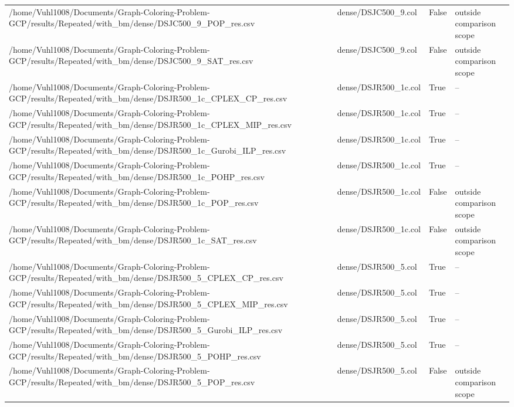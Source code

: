 \begin{table}[htbp]
\begin{tabular}{llll}
/home/Vuhl1008/Documents/Graph-Coloring-Problem-GCP/results/Repeated/with\_bm/dense/DSJC500\_9\_POP\_res.csv & dense/DSJC500\_9.col & False & outside comparison scope \\
/home/Vuhl1008/Documents/Graph-Coloring-Problem-GCP/results/Repeated/with\_bm/dense/DSJC500\_9\_SAT\_res.csv & dense/DSJC500\_9.col & False & outside comparison scope \\
/home/Vuhl1008/Documents/Graph-Coloring-Problem-GCP/results/Repeated/with\_bm/dense/DSJR500\_1c\_CPLEX\_CP\_res.csv & dense/DSJR500\_1c.col & True & -- \\
/home/Vuhl1008/Documents/Graph-Coloring-Problem-GCP/results/Repeated/with\_bm/dense/DSJR500\_1c\_CPLEX\_MIP\_res.csv & dense/DSJR500\_1c.col & True & -- \\
/home/Vuhl1008/Documents/Graph-Coloring-Problem-GCP/results/Repeated/with\_bm/dense/DSJR500\_1c\_Gurobi\_ILP\_res.csv & dense/DSJR500\_1c.col & True & -- \\
/home/Vuhl1008/Documents/Graph-Coloring-Problem-GCP/results/Repeated/with\_bm/dense/DSJR500\_1c\_POHP\_res.csv & dense/DSJR500\_1c.col & True & -- \\
/home/Vuhl1008/Documents/Graph-Coloring-Problem-GCP/results/Repeated/with\_bm/dense/DSJR500\_1c\_POP\_res.csv & dense/DSJR500\_1c.col & False & outside comparison scope \\
/home/Vuhl1008/Documents/Graph-Coloring-Problem-GCP/results/Repeated/with\_bm/dense/DSJR500\_1c\_SAT\_res.csv & dense/DSJR500\_1c.col & False & outside comparison scope \\
/home/Vuhl1008/Documents/Graph-Coloring-Problem-GCP/results/Repeated/with\_bm/dense/DSJR500\_5\_CPLEX\_CP\_res.csv & dense/DSJR500\_5.col & True & -- \\
/home/Vuhl1008/Documents/Graph-Coloring-Problem-GCP/results/Repeated/with\_bm/dense/DSJR500\_5\_CPLEX\_MIP\_res.csv & dense/DSJR500\_5.col & True & -- \\
/home/Vuhl1008/Documents/Graph-Coloring-Problem-GCP/results/Repeated/with\_bm/dense/DSJR500\_5\_Gurobi\_ILP\_res.csv & dense/DSJR500\_5.col & True & -- \\
/home/Vuhl1008/Documents/Graph-Coloring-Problem-GCP/results/Repeated/with\_bm/dense/DSJR500\_5\_POHP\_res.csv & dense/DSJR500\_5.col & True & -- \\
/home/Vuhl1008/Documents/Graph-Coloring-Problem-GCP/results/Repeated/with\_bm/dense/DSJR500\_5\_POP\_res.csv & dense/DSJR500\_5.col & False & outside comparison scope \\

\end{tabular}
\end{table}
